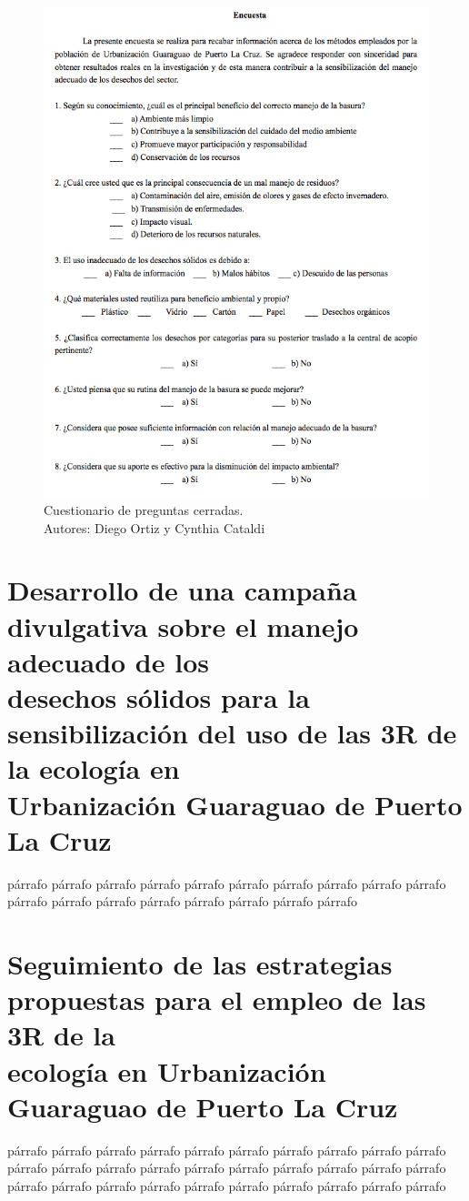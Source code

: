 \begin{figure}[!ht]
    \centering
    \includegraphics[width=12cm]{Media/Encuesta.png}
    \caption{Cuestionario de preguntas cerradas. \\[6pt] Autores: Diego Ortiz y Cynthia Cataldi}
    \label{fig:encuesta}
\end{figure}

\newpage

\section{Desarrollo de una campaña divulgativa sobre el manejo adecuado de los \\[6pt] desechos sólidos para la sensibilización del uso de las 3R de la ecología en \\[6pt] Urbanización Guaraguao de Puerto La Cruz}

párrafo párrafo párrafo párrafo párrafo párrafo párrafo párrafo párrafo párrafo párrafo párrafo párrafo párrafo párrafo párrafo párrafo párrafo 

\section{Seguimiento de las estrategias propuestas para el empleo de las 3R de la \\[6pt] ecología en Urbanización Guaraguao de Puerto La Cruz}

párrafo párrafo párrafo párrafo párrafo párrafo párrafo párrafo párrafo párrafo párrafo párrafo párrafo párrafo párrafo párrafo párrafo párrafo párrafo párrafo párrafo párrafo párrafo párrafo párrafo párrafo párrafo párrafo párrafo párrafo 

\newpage